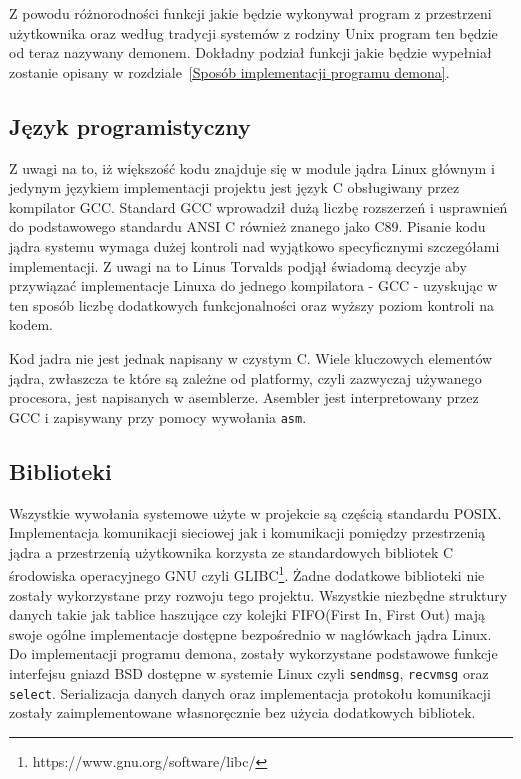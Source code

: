 \documentclass[10pt]{article}
\begin{document}
Z powodu różnorodności funkcji jakie będzie wykonywał program z przestrzeni użytkownika oraz według tradycji systemów z rodziny Unix program ten będzie od teraz nazywany demonem. Dokładny podział funkcji jakie będzie wypełniał zostanie opisany w rozdziale~\ref{Sposób implementacji programu demona}.

\subsection{Język programistyczny}
\label{language}

Z uwagi na to, iż większość kodu znajduje się w module jądra Linux głównym i jedynym językiem implementacji projektu jest język C obsługiwany przez kompilator GCC\@. Standard GCC wprowadził dużą liczbę rozszerzeń i usprawnień do podstawowego standardu ANSI C również znanego jako C89. Pisanie kodu jądra systemu wymaga dużej kontroli nad wyjątkowo specyficznymi szczegółami implementacji. Z uwagi na to Linus Torvalds podjął świadomą decyzje aby przywiązać implementacje Linuxa do jednego kompilatora - GCC - uzyskując w ten sposób liczbę dodatkowych funkcjonalności\cite{gccextensions} oraz wyższy poziom kontroli na kodem.

Kod jadra nie jest jednak napisany w czystym C. Wiele kluczowych elementów jądra, zwłaszcza te które są zależne od platformy, czyli zazwyczaj używanego procesora, jest napisanych w asemblerze. Asembler jest interpretowany przez GCC i zapisywany przy pomocy wywołania \texttt{asm}\cite{asm}.

\subsection{Biblioteki}
\label{libraries}

Wszystkie wywołania systemowe użyte w projekcie są częścią standardu POSIX\@. Implementacja komunikacji sieciowej jak i komunikacji pomiędzy przestrzenią jądra a przestrzenią użytkownika korzysta ze standardowych bibliotek C środowiska operacyjnego GNU czyli GLIBC\footnote{https://www.gnu.org/software/libc/}. Żadne dodatkowe biblioteki nie zostały wykorzystane przy rozwoju tego projektu.  Wszystkie niezbędne struktury danych takie jak tablice haszujące czy kolejki FIFO(First In, First Out) mają swoje ogólne implementacje dostępne bezpośrednio w nagłówkach jądra Linux. Do implementacji programu demona, zostały wykorzystane podstawowe funkcje interfejsu gniazd BSD dostępne w systemie Linux czyli \texttt{sendmsg}, \texttt{recvmsg} oraz \texttt{select}. Serializacja danych danych oraz implementacja protokołu komunikacji zostały zaimplementowane własnoręcznie bez użycia dodatkowych bibliotek.
\end{document}
